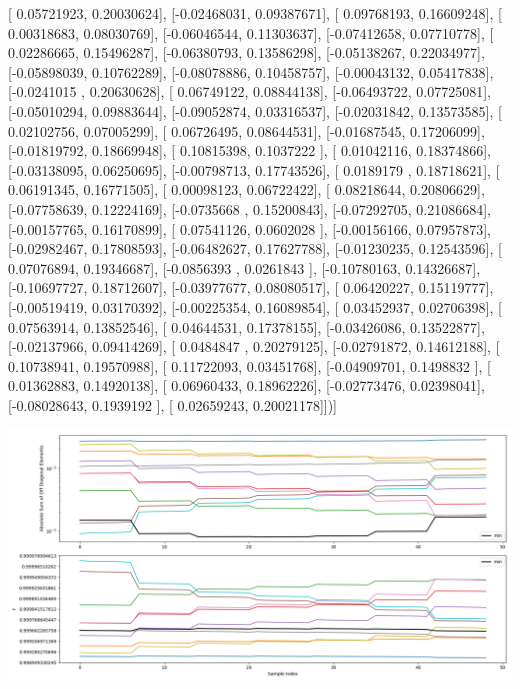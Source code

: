 \documentclass{article}
\begin{document}
       [ 0.05721923,  0.20030624],
       [-0.02468031,  0.09387671],
       [ 0.09768193,  0.16609248],
       [ 0.00318683,  0.08030769],
       [-0.06046544,  0.11303637],
       [-0.07412658,  0.07710778],
       [ 0.02286665,  0.15496287],
       [-0.06380793,  0.13586298],
       [-0.05138267,  0.22034977],
       [-0.05898039,  0.10762289],
       [-0.08078886,  0.10458757],
       [-0.00043132,  0.05417838],
       [-0.0241015 ,  0.20630628],
       [ 0.06749122,  0.08844138],
       [-0.06493722,  0.07725081],
       [-0.05010294,  0.09883644],
       [-0.09052874,  0.03316537],
       [-0.02031842,  0.13573585],
       [ 0.02102756,  0.07005299],
       [ 0.06726495,  0.08644531],
       [-0.01687545,  0.17206099],
       [-0.01819792,  0.18669948],
       [ 0.10815398,  0.1037222 ],
       [ 0.01042116,  0.18374866],
       [-0.03138095,  0.06250695],
       [-0.00798713,  0.17743526],
       [ 0.0189179 ,  0.18718621],
       [ 0.06191345,  0.16771505],
       [ 0.00098123,  0.06722422],
       [ 0.08218644,  0.20806629],
       [-0.07758639,  0.12224169],
       [-0.0735668 ,  0.15200843],
       [-0.07292705,  0.21086684],
       [-0.00157765,  0.16170899],
       [ 0.07541126,  0.0602028 ],
       [-0.00156166,  0.07957873],
       [-0.02982467,  0.17808593],
       [-0.06482627,  0.17627788],
       [-0.01230235,  0.12543596],
       [ 0.07076894,  0.19346687],
       [-0.0856393 ,  0.0261843 ],
       [-0.10780163,  0.14326687],
       [-0.10697727,  0.18712607],
       [-0.03977677,  0.08080517],
       [ 0.06420227,  0.15119777],
       [-0.00519419,  0.03170392],
       [-0.00225354,  0.16089854],
       [ 0.03452937,  0.02706398],
       [ 0.07563914,  0.13852546],
       [ 0.04644531,  0.17378155],
       [-0.03426086,  0.13522877],
       [-0.02137966,  0.09414269],
       [ 0.0484847 ,  0.20279125],
       [-0.02791872,  0.14612188],
       [ 0.10738941,  0.19570988],
       [ 0.11722093,  0.03451768],
       [-0.04909701,  0.1498832 ],
       [ 0.01362883,  0.14920138],
       [ 0.06960433,  0.18962226],
       [-0.02773476,  0.02398041],
       [-0.08028643,  0.1939192 ],
       [ 0.02659243,  0.20021178]])]
\begin{center}
\includegraphics[scale=.9]{report_pickled_controls122/control_dpn_all.png}

\end{center}
\end{document}
